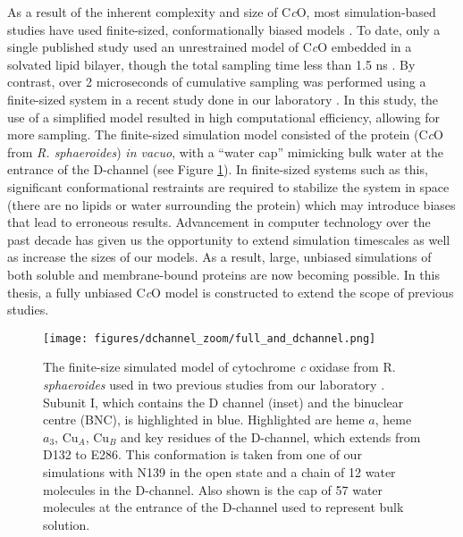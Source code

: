 As a result of the inherent complexity and size of C\emph{c}O, most simulation-based studies have used finite-sized, conformationally biased models \cite{Tashiro:2005p7174,Xu:2008p9867,Ghosh:2009p10110,Sugitani:2009p5715,Henry:2009p4543,Kaila:2009p6199}. To date, only a single published study used an unrestrained model of C\emph{c}O embedded in a solvated lipid bilayer, though the total sampling time less than 1.5 ns \cite{Olkhova:2004p6851}. By contrast, over 2 microseconds of cumulative sampling was performed using a finite-sized system in a recent study done in our laboratory \cite{Henry:2011p10221}. In this study, the use of a simplified model resulted in high computational efficiency, allowing for more sampling. The finite-sized simulation model consisted of the protein (C\emph{c}O from \emph{R. sphaeroides}) \emph{in vacuo}, with a ``water cap'' mimicking bulk water at the entrance of the D-channel (see Figure \ref{fig:dchannel_full_zoom}). In finite-sized systems such as this, significant conformational restraints are required to stabilize the system in space (there are no lipids or water surrounding the protein) which may introduce biases that lead to erroneous results. Advancement in computer technology over the past decade has given us the opportunity to extend simulation timescales as well as increase the sizes of our models. As a result, large, unbiased simulations of both soluble and membrane-bound proteins are now becoming possible. In this thesis, a fully unbiased C\emph{c}O model is constructed to extend the scope of previous studies.

\begin{figure}[htbp]
\centering
\texttt{[image: figures/dchannel\_zoom/full\_and\_dchannel.png]}
\caption[The finite-size simulated model of cytochrome \emph{c} oxidase from R. \emph{sphaeroides} used in two previous studies from our laboratory.]{The finite-size simulated model of cytochrome \emph{c} oxidase from R. \emph{sphaeroides} used in two previous studies from our laboratory \cite{Henry:2009p4543,Henry:2011p10221}. Subunit I, which contains the D channel (inset) and the binuclear centre (BNC), is highlighted in blue. Highlighted are heme $a$, heme $a_3$, Cu$_A$, Cu$_B$ and key residues of the D-channel, which extends from D132 to E286. This conformation is taken from one of our simulations with N139 in the open state and a chain of 12 water molecules in the D-channel. Also shown is the cap of 57 water molecules at the entrance of the D-channel used to represent bulk solution.}
\label{fig:dchannel_full_zoom}
\end{figure}

